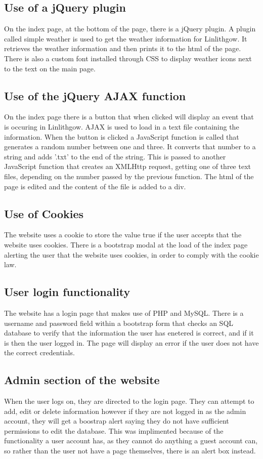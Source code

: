 \documentclass[12pt,a4paper]{article}
\begin{document}
		\subsection{Use of a jQuery plugin}
		On the index page, at the bottom of the page, there is a jQuery plugin. A plugin called simple weather is used to get the weather information for Linlithgow. It retrieves the weather information and then prints it to the html of the page. There is also a custom font installed through CSS to display weather icons next to the text on  the main page.

		\subsection{Use of the jQuery AJAX function}
		On the index page there is a button that when clicked will display an event that is occuring in Linlithgow. AJAX is used to load in a text file containing the information. When the button is clicked a JavaScript function is called that generates a random number between one and three. It converts that number to a string and adds '.txt' to the end of the string. This is passed to another JavaScript function that creates an XMLHttp request, getting one of three text files, depending on  the number passed by the previous function. The html of the page is edited and the content of the file is added to a div.

		\subsection{Use of Cookies}
		The website uses a cookie to store the value true if the user accepts that the website uses cookies. There is a bootstrap modal at the load of the index page alerting the user that the website uses cookies, in order to comply with the cookie law.

		\subsection{User login functionality}
		The website has a login page that makes use of PHP and MySQL. There is a username and password field within a bootstrap form that checks an SQL database to verify that the information the user has enetered is correct, and if it is then the user logged in. The page will display an error if the user does not have the correct credentials.

		\subsection{Admin section of the website}
		When the user logs on, they are directed to the login page. They can attempt to add, edit or delete information however if they are not logged in as the admin account, they will get a boostrap alert saying they do not have sufficient permissions to edit the database. This was implimented because of the functionality a user account has, as they cannot do anything a guest account can, so rather than the user not have a page themselves, there is an alert box instead.
\end{document}

